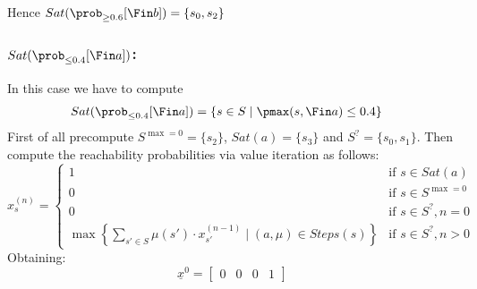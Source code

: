 Hence $Sat(\prob_{\ge 0.6}  [\Fin b]) = \{ s_0, s_2 \}$

\subsubsection*{$Sat(\prob_{\le 0.4} [\Fin a])$:}

In this case we have to compute
\begin{align*}
	Sat(\prob_{\le 0.4} [\Fin a]) & = \{s \in S \mid \pmax(s, \Fin a) \le 0.4\}
\end{align*}
First of all precompute $S^{\max=0} = \{s_2\}$, $Sat(a) = \{ s_3 \}$
and $S^? = \{ s_0, s_1 \}$.
Then compute the reachability probabilities via value iteration as follows:
\[
	x_s^{(n)} =
	\begin{cases}
		1                                                                                            & \text{if } s \in Sat(a)     \\
		0                                                                                            & \text{if } s \in S^{\max=0} \\
		0                                                                                            & \text{if } s \in S^?, n = 0 \\
		\max \left\{ \sum_{s' \in S} \mu(s')\cdot x_{s'}^{(n-1)} \mid (a, \mu) \in Steps(s) \right\} & \text{if } s \in S^?, n > 0
	\end{cases}
\]
Obtaining:
\[
	\underline{x}^0 = \begin{bmatrix} 0 & 0 & 0 & 1 \end{bmatrix}
\]
